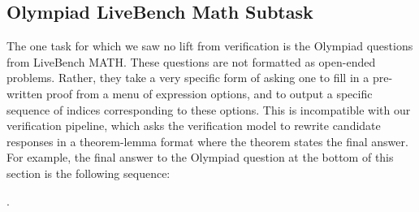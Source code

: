 \subsection{Olympiad LiveBench Math Subtask}
\label{app:oddity}

The one task for which we saw no lift from verification is the Olympiad questions from LiveBench MATH.
These questions are not formatted as open-ended problems.
Rather, they take a very specific form of asking one to fill in a pre-written proof from a menu of expression options, and to output a specific sequence of indices corresponding to these options.
This is incompatible with our verification pipeline, which asks the verification model to rewrite candidate responses in a theorem-lemma format where the theorem states the final answer.
For example, the final answer to the Olympiad question at the bottom of this section is the following sequence:

.

